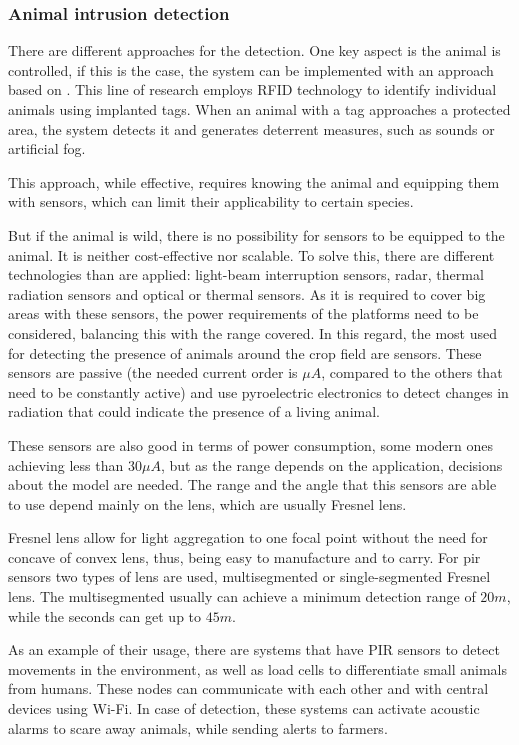 \subsubsection*{Animal intrusion detection}

There are different approaches for the detection. One key aspect is the animal is controlled, if this is the case, the system can be implemented with an approach based on . 
This line of research employs RFID technology to identify individual animals using implanted tags. When an animal with a tag approaches a protected area, 
the system detects it and generates deterrent measures, such as sounds or artificial fog. 

This approach, while effective, requires knowing the animal and equipping them with sensors, which can limit their applicability to certain species. 

But if the animal is wild, there is no possibility for sensors to be equipped to the animal. It is neither cost-effective nor scalable. To solve this, there are different technologies than are applied: 
light-beam interruption sensors, radar, thermal radiation sensors and optical or thermal sensors. 
As it is required to cover big areas with these sensors, the power requirements of the platforms need to be considered, balancing this with the range covered. 
In this regard, the most used for detecting the presence of animals around the crop field are  sensors. These sensors are passive (the needed current order is $\mu A$, compared to the others that need to be constantly active) and use pyroelectric electronics to 
detect changes in radiation that could indicate the presence of a living animal. 

These sensors are also good in terms of power consumption, some modern ones achieving less than $30 \mu A$\cite{astind250613}, but as the range depends on the application, decisions about the model 
are needed. The range and the angle that this sensors are able to use depend mainly on the lens, which are usually Fresnel lens.

Fresnel lens allow for light aggregation to one focal point without the need for concave of convex lens, thus, being easy to manufacture and to carry. For \acrshort{pir} sensors 
two types of lens are used, multisegmented or single-segmented Fresnel lens.
The multisegmented usually can achieve a minimum detection range of $20 m$, while the seconds can get up to $45 m$\cite{IoTSensorNetwork}.


As an example of their usage, there are systems that have PIR sensors to detect movements in the environment, as well as load cells to differentiate small animals from humans\cite{ImplementationCropProtection}. 
These nodes can communicate with each other and with central devices using Wi-Fi. In case of detection, these systems can activate acoustic alarms to scare away animals, while sending alerts to farmers.

